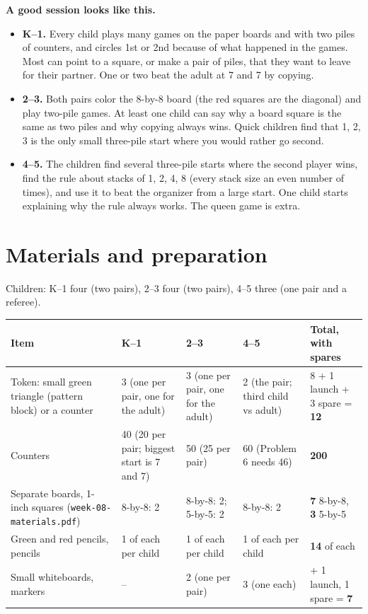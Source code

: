 \documentclass[10pt]{article}
\begin{document}
\textbf{A good session looks like this.}
\begin{itemize}
\item \textbf{K--1.} Every child plays many games on the paper boards and with two piles of counters, and circles 1st or 2nd because of what happened in the games. Most can point to a square, or make a pair of piles, that they want to leave for their partner. One or two beat the adult at 7 and 7 by copying.
\item \textbf{2--3.} Both pairs color the 8-by-8 board (the red squares are the diagonal) and play two-pile games. At least one child can say why a board square is the same as two piles and why copying always wins. Quick children find that 1, 2, 3 is the only small three-pile start where you would rather go second.
\item \textbf{4--5.} The children find several three-pile starts where the second player wins, find the rule about stacks of 1, 2, 4, 8 (every stack size an even number of times), and use it to beat the organizer from a large start. One child starts explaining why the rule always works. The queen game is extra.
\end{itemize}

\section{Materials and preparation}\label{s2}

Children: K--1 four (two pairs), 2--3 four (two pairs), 4--5 three (one pair and a referee).

{\small
\begin{longtable}{@{}P{1.75in}P{1.1in}P{1.05in}P{1.2in}P{\dimexpr\textwidth-5.1in-8\tabcolsep\relax}@{}}
\toprule
\textbf{Item} & \textbf{K--1} & \textbf{2--3} & \textbf{4--5} & \textbf{Total, with spares}\\ \midrule \endhead
Token: small green triangle (pattern block) or a counter & 3 (one per pair, one for the adult) & 3 (one per pair, one for the adult) & 2 (the pair; third child vs adult) & 8 + 1 launch + 3 spare = \textbf{12}\\ \midrule
Counters & 40 (20 per pair; biggest start is 7 and 7) & 50 (25 per pair) & 60 (Problem 6 needs 46) & \textbf{200}\\ \midrule
Separate boards, 1-inch squares (\texttt{week-08-materials.pdf}) & 8-by-8: 2 & 8-by-8: 2; 5-by-5: 2 & 8-by-8: 2 & \textbf{7} 8-by-8, \textbf{3} 5-by-5\\ \midrule
Green and red pencils, pencils & 1 of each per child & 1 of each per child & 1 of each per child & \textbf{14} of each\\ \midrule
Small whiteboards, markers & -- & 2 (one per pair) & 3 (one each) & + 1 launch, 1 spare = \textbf{7}\\ \bottomrule
\end{longtable}}
\end{document}
